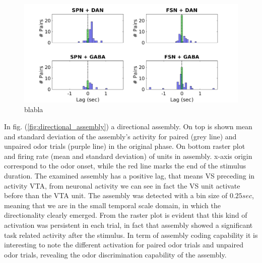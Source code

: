 \begin{figure}[H]
\centering
\includegraphics[scale=0.4]{figures/LagSec4Typo3VS.png}
\caption{blabla}
\label{fig:LagInSecAll}
\end{figure}
In fig. (\ref{fig:directional_assembly}) a directional assembly. On top is shown mean and standard deviation of the assembly's activity for paired (grey line) and unpaired odor trials (purple line) in the original phase. On bottom raster plot and firing rate (mean and standard deviation) of units in assembly. x-axis origin correspond to the odor onset, while the red line marks the end of the stimulus duration. The examined assembly has a positive lag, that means VS preceding in activity VTA, from neuronal activity we can see in fact the VS unit activate before than the VTA unit. The assembly was detected with a bin size of $0.25 sec$, meaning that we are in the small temporal scale domain, in which the directionality clearly emerged. From the raster plot is evident that this kind of activation was persistent in each trial, in fact that assembly showed a significant task related activity after the stimulus. In term of assembly coding capability it is interesting to note the different activation for paired odor trials and unpaired odor trials, revealing the odor discrimination capability of the assembly. 
